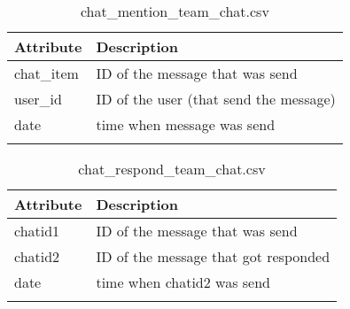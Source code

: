 \begin{center}
\begin{longtable}{ |l|l| } 
 \hline
 Attribute & Description\\ 
 \hline
 chat\_item & ID of the message that was send\\ 
 \hline
 user\_id & ID of the user (that send the message)\\ 
 \hline
 date & time when message was send\\ 
 \hline
\caption{chat\_mention\_team\_chat.csv}
\end{longtable}
\end{center}

\begin{center}
\begin{longtable}{ |l|l| } 
 \hline
 Attribute & Description\\ 
 \hline
chatid1 & ID of the message that was send\\ 
 \hline
chatid2 & ID of the message that got responded\\ 
 \hline
 date & time when chatid2 was send\\ 
 \hline
\caption{chat\_respond\_team\_chat.csv}
\end{longtable}
\end{center}